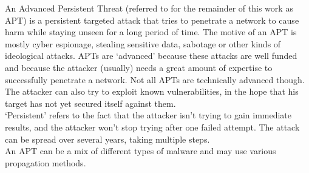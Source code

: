 An Advanced Persistent Threat (referred to for the remainder of this work as APT) is a persistent targeted attack that tries to penetrate a network to cause harm while staying unseen for a long period of time. The motive of an APT is mostly cyber espionage, stealing sensitive data, sabotage or other kinds of ideological attacks. APTs are `advanced' because these attacks are well funded and because the attacker (usually) needs a great amount of expertise to successfully penetrate a network. Not all APTs are technically advanced though. The attacker can also try to exploit known vulnerabilities, in the hope that his target has not yet secured itself against them. \\
`Persistent' refers to the fact that the attacker isn't trying to gain immediate results, and the attacker won't stop trying after one failed attempt. The attack can be spread over several years, taking multiple steps.  \\
An APT can be a mix of different types of malware and may use various propagation methods. \\
%
%
%
%
%

